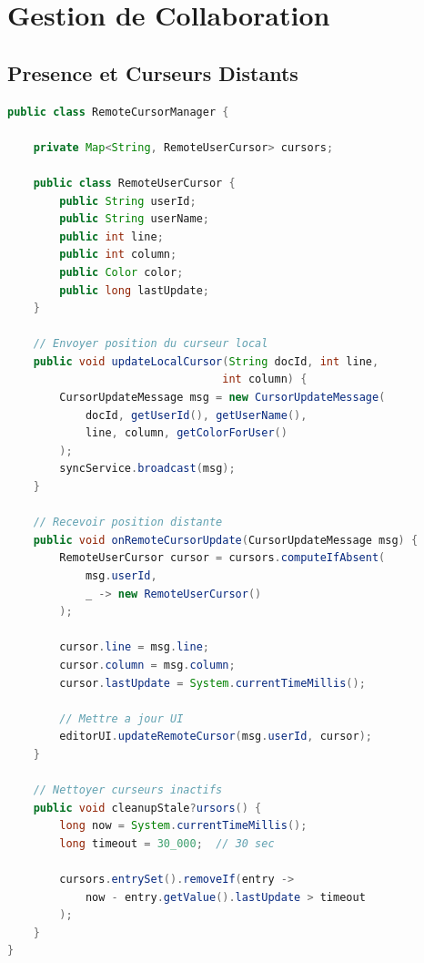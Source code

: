 \documentclass[11pt,a4paper,hidelinks]{book}
\begin{document}
\section{Gestion de Collaboration}

\subsection{Presence et Curseurs Distants}

\begin{lstlisting}[language=Java, caption={Remote Cursor Manager}]
public class RemoteCursorManager {
    
    private Map<String, RemoteUserCursor> cursors;
    
    public class RemoteUserCursor {
        public String userId;
        public String userName;
        public int line;
        public int column;
        public Color color;
        public long lastUpdate;
    }
    
    // Envoyer position du curseur local
    public void updateLocalCursor(String docId, int line, 
                                 int column) {
        CursorUpdateMessage msg = new CursorUpdateMessage(
            docId, getUserId(), getUserName(),
            line, column, getColorForUser()
        );
        syncService.broadcast(msg);
    }
    
    // Recevoir position distante
    public void onRemoteCursorUpdate(CursorUpdateMessage msg) {
        RemoteUserCursor cursor = cursors.computeIfAbsent(
            msg.userId,
            _ -> new RemoteUserCursor()
        );
        
        cursor.line = msg.line;
        cursor.column = msg.column;
        cursor.lastUpdate = System.currentTimeMillis();
        
        // Mettre a jour UI
        editorUI.updateRemoteCursor(msg.userId, cursor);
    }
    
    // Nettoyer curseurs inactifs
    public void cleanupStale?ursors() {
        long now = System.currentTimeMillis();
        long timeout = 30_000;  // 30 sec
        
        cursors.entrySet().removeIf(entry -> 
            now - entry.getValue().lastUpdate > timeout
        );
    }
}
\end{lstlisting}

\end{document}
